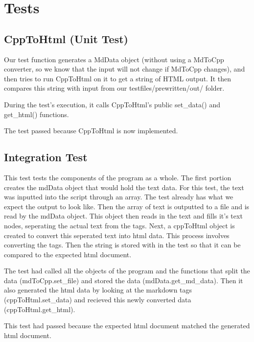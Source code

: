 \section{Tests}
\subsection{CppToHtml (Unit Test)}

Our test function generates a MdData object (without using a MdToCpp converter, so we know that the input will not change if MdToCpp changes), and then tries to run CppToHtml on it to get a string of HTML output. It then compares this string with input from our testfiles/prewritten/out/  folder. 

During the test's execution, it calls CppToHtml's public set\_data() and get\_html() functions.

The test passed because CppToHtml is now implemented.


\subsection{Integration Test}
This test tests the components of the program as a whole. The first portion creates the mdData object that would hold the text data. For this test, the text was inputted into the script through an array. The test already has what we expect the output to look like. Then the array of text is outputted to a file and is read by the mdData object. This object then reads in the text and fills it's text nodes, seperating the actual text from the tags. Next, a cppToHtml object is created to convert this seperated text into html data. This process involves converting the tags. Then the string is stored with in the test so that it can be compared to the expected html document. 

The test had called all the objects of the program and the functions that split the data (mdToCpp.set_file) and stored the data (mdData.get_md_data). Then it also generated the html data by looking at the markdown tags (cppToHtml.set_data) and recieved this newly converted data (cppToHtml.get_html).  

This test had passed because the expected html document matched the generated html document.  

